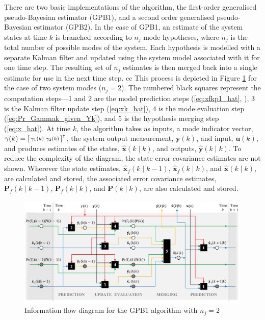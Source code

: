 There are two basic implementations of the algorithm, the first-order generalised pseudo-Bayesian estimator (GPB1), and a second order generalised pseudo-Bayesian estimator (GPB2). In the case of GPB1, an estimate of the system states at time $k$ is branched according to $n_j$ mode hypotheses, where $n_j$ is the total number of possible modes of the system. Each hypothesis is modelled with a separate Kalman filter and updated using the system model associated with it for one time step. The resulting set of $n_j$ estimates is then merged back into a single estimate for use in the next time step.
cc
This process is depicted in Figure \ref{fig:gpb1-diagram} for the case of two system modes ($n_j=2$). The numbered black squares represent the computation steps---1 and 2 are the model prediction steps (\ref{eq:xfkp1_hat}, ), 3 is the Kalman filter update step (\ref{eq:xk_hat}), 4 is the mode evaluation step (\ref{eq:Pr_Gammak_given_Yk}), and 5 is the hypothesis merging step (\ref{eq:x_hat}). At time $k$, the algorithm takes as inputs, a mode indicator vector, $\gamma(k)=\begin{bsmallmatrix} \gamma_1(k) & \gamma_2(k) \end{bsmallmatrix}^\intercal$, the system output measurement, $\mathbf{y}(k)$, and input, $\mathbf{u}(k)$, and produces estimates of the states, $\hat{\mathbf{x}}(k \mid k)$, and outputs, $\hat{\mathbf{y}}(k \mid k)$. To reduce the complexity of the diagram, the state error covariance estimates are not shown. Wherever the state estimates, $\hat{\mathbf{x}}_f(k \mid k-1)$, $\hat{\mathbf{x}}_f(k \mid k)$, and $\hat{\mathbf{x}}(k \mid k)$, are calculated and stored, the associated error covariance estimates, $\mathbf{P}_f(k \mid k-1)$, $\mathbf{P}_f(k \mid k)$, and $\mathbf{P}(k \mid k)$, are also calculated and stored.

\begin{figure}[htp]
	\centering
	\includegraphics[width=15.5cm]{images/gpb1_diagram.pdf}
	\caption{Information flow diagram for the GPB1 algorithm with $n_j=2$}
	\label{fig:gpb1-diagram}
\end{figure}


